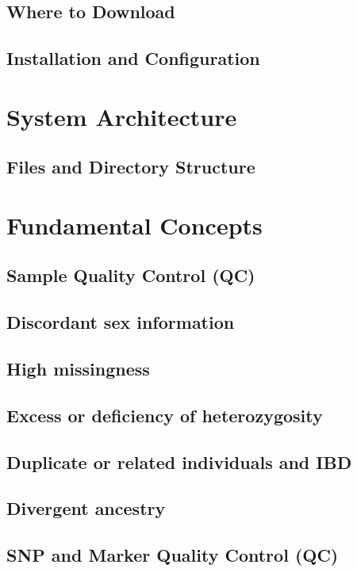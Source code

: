 \documentclass{article}
\begin{document}
\subsection{Where to Download}

\subsection{Installation and Configuration}
\vspace{1em} %


\section{System Architecture}
\subsection{Files and Directory Structure}
\vspace{1em} %

\section{Fundamental Concepts}
\subsection{Sample Quality Control (QC)}
\subsection{Discordant sex information}
\subsection{High missingness}
\subsection{Excess or deficiency of heterozygosity}
\subsection{Duplicate or related individuals and IBD}
\subsection{Divergent ancestry}
\subsection{SNP and Marker Quality Control (QC)}
\end{document}
